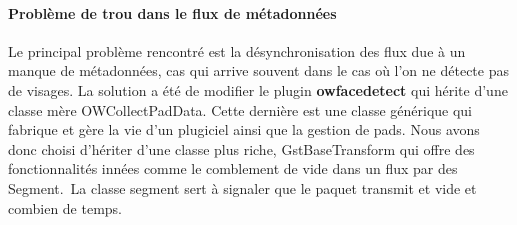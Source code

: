 \paragraph{Problème de trou dans le flux de métadonnées}
Le principal problème rencontré est la désynchronisation des flux due à un manque de métadonnées, cas qui arrive souvent dans le cas où l'on ne détecte pas de visages. La solution a été de modifier le plugin \textbf{owfacedetect} qui hérite d'une classe mère OWCollectPadData. Cette dernière est une classe générique qui fabrique et gère la vie d'un plugiciel ainsi que la gestion de pads. Nous avons donc choisi d'hériter d'une classe plus riche, GstBaseTransform qui offre des fonctionnalités innées comme le comblement de vide dans un flux par des Segment. La classe segment sert à signaler que le paquet transmit et vide et combien de temps.